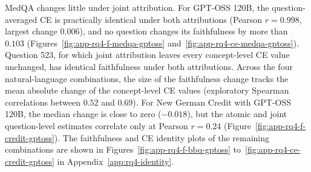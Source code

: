 MedQA changes little under joint attribution. For GPT-OSS 120B, the question-averaged CE is practically identical under both attributions (Pearson $r=0.998$, largest change $0.006$), and no question changes its faithfulness by more than $0.103$ (Figures~\ref{fig:app-rq4-f-medqa-gptoss} and~\ref{fig:app-rq4-ce-medqa-gptoss}). Question 523, for which joint attribution leaves every concept-level CE value unchanged, has identical faithfulness under both attributions. Across the four natural-language combinations, the size of the faithfulness change tracks the mean absolute change of the concept-level CE values (exploratory Spearman correlations between $0.52$ and $0.69$). For New German Credit with GPT-OSS 120B, the median change is close to zero ($-0.018$), but the atomic and joint question-level estimates correlate only at Pearson $r=0.24$ (Figure~\ref{fig:app-rq4-f-credit-gptoss}). The faithfulness and CE identity plots of the remaining combinations are shown in Figures~\ref{fig:app-rq4-f-bbq-gptoss} to~\ref{fig:app-rq4-ce-credit-gptoss} in Appendix~\ref{app:rq4-identity}.
